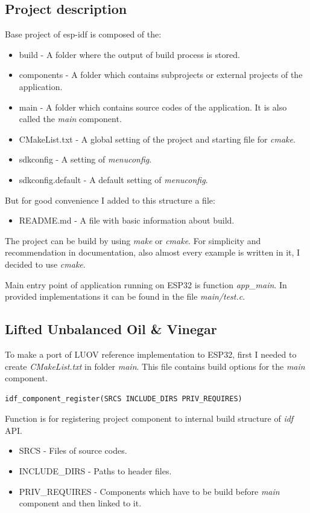 \documentclass[thesis=M,english]{FITthesis}[2019/12/23]
\begin{document}
\subsection{Project description}
Base project of esp-idf is composed of the:
\begin{itemize}
\item	build - A folder where the output of build process is stored.
\item	components - A folder which contains subprojects or external projects of the application.
\item	main - A folder which contains source codes of the application. It is also called the \textit{main} component. 
\item	CMakeList.txt - A global setting of the project and starting file for \textit{cmake}. 
\item	sdkconfig - A setting of \textit{menuconfig}.
\item	sdkconfig.default - A default setting of \textit{menuconfig}.
\end{itemize}
But for good convenience I added to this structure a file:
\begin{itemize}
\item	README.md - A file with basic information about build.
\end{itemize}

\noindent
The project can be build by using \textit{make} or \textit{cmake}. For simplicity and recommendation in documentation, also almost every example is written in it, I decided to use \textit{cmake}.

\bigskip
\noindent
Main entry point of application running on ESP32 is function \textit{app\_main}. In provided implementations it can be found in the file \textit{main/test.c}.

\subsection{Lifted Unbalanced Oil \& Vinegar} \label{esp-luov-make}
To make a port of LUOV reference implementation to ESP32, first I needed to create \textit{CMakeList.txt} in folder \textit{main}. This file contains build options for the \textit{main} component.
\begin{lstlisting}[frame=single]
idf_component_register(SRCS INCLUDE_DIRS PRIV_REQUIRES)
\end{lstlisting}
Function is for registering project component to internal build structure of \textit{idf} API.
\begin{itemize}
\item	SRCS  - Files of source codes.
\item	INCLUDE\_DIRS - Paths to header files.
\item	PRIV\_REQUIRES - Components which have to be build before \textit{main} component and then linked to it.
\end{itemize}
\end{document}
